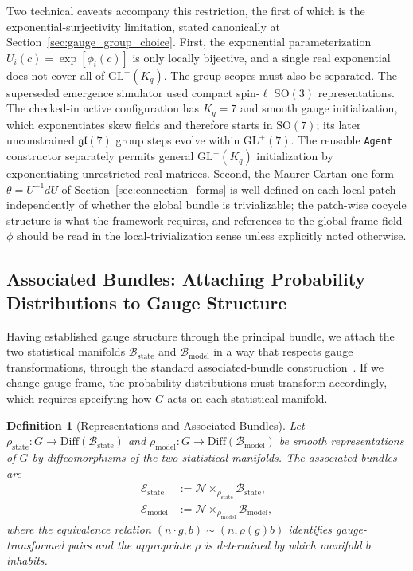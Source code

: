\documentclass[11pt]{article}
\newtheorem{definition}{Definition}
\begin{document}
Two technical caveats accompany this restriction, the first of which is the exponential-surjectivity limitation, stated canonically at Section~\ref{sec:gauge_group_choice}. First, the exponential parameterization $U_i(c)=\exp[\phi_i(c)]$ is only locally bijective, and a single real exponential does not cover all of $\mathrm{GL}^+(K_q)$. The group scopes must also be separated. The superseded emergence simulator used compact spin-$\ell$ $\mathrm{SO}(3)$ representations. The checked-in active configuration has $K_q=7$ and smooth gauge initialization, which exponentiates skew fields and therefore starts in $\mathrm{SO}(7)$; its later unconstrained $\mathfrak{gl}(7)$ group steps evolve within $\mathrm{GL}^+(7)$. The reusable \texttt{Agent} constructor separately permits general $\mathrm{GL}^+(K_q)$ initialization by exponentiating unrestricted real matrices. Second, the Maurer-Cartan one-form $\theta=U^{-1}dU$ of Section~\ref{sec:connection_forms} is well-defined on each local patch independently of whether the global bundle is trivializable; the patch-wise cocycle structure is what the framework requires, and references to the global frame field $\phi$ should be read in the local-trivialization sense unless explicitly noted otherwise.

\subsection{Associated Bundles: Attaching Probability Distributions to Gauge Structure}

Having established gauge structure through the principal bundle, we attach the two statistical manifolds $\mathcal{B}_{\mathrm{state}}$ and $\mathcal{B}_{\mathrm{model}}$ in a way that respects gauge transformations, through the standard associated-bundle construction~\cite{Nakahara2003, frankel2011geometry}. If we change gauge frame, the probability distributions must transform accordingly, which requires specifying how $G$ acts on each statistical manifold.

\begin{definition}[Representations and Associated Bundles]
Let $\rho_{\mathrm{state}}: G \to \mathrm{Diff}(\mathcal{B}_{\mathrm{state}})$ and $\rho_{\mathrm{model}}: G \to \mathrm{Diff}(\mathcal{B}_{\mathrm{model}})$ be smooth representations of $G$ by diffeomorphisms of the two statistical manifolds. The associated bundles are
\begin{align}
\mathcal{E}_{\mathrm{state}} &:= \mathcal{N} \times_{\rho_{\mathrm{state}}} \mathcal{B}_{\mathrm{state}}, \\
\mathcal{E}_{\mathrm{model}} &:= \mathcal{N} \times_{\rho_{\mathrm{model}}} \mathcal{B}_{\mathrm{model}},
\end{align}
where the equivalence relation $(n \cdot g, b) \sim (n, \rho(g)b)$ identifies gauge-transformed pairs and the appropriate $\rho$ is determined by which manifold $b$ inhabits.
\end{definition}
\end{document}
